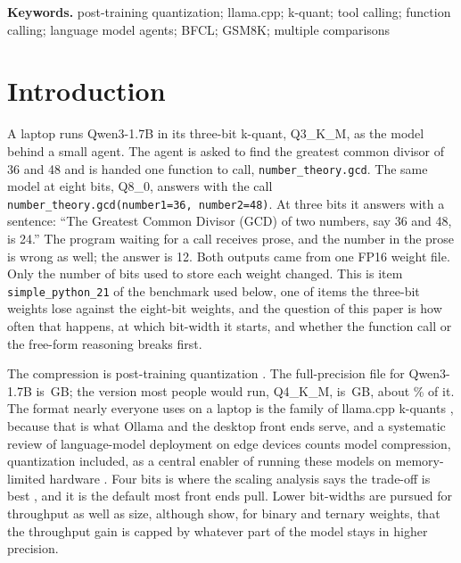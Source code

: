 \documentclass[12pt,letterpaper]{article}
\newcommand{\qm}{Qwen3-1.7B}
\begin{document}
\begin{abstract}
\textbf{Conclusions.} At four bits no model shows a single-call loss larger than its paired interval allows: under the coerced verdict no lower interval end is below $\qtFourBitLoCoerced{}$ points and the minimum detectable difference is \qtFourBitMdeMin{} to \qtFourBitMdeMax{} points. At three bits \qm{} and, under strict scoring, Llama-3.2-3B lose accuracy; the other three models do not detectably. The length-driven collapse of chain-of-thought reasoning under three-bit weights does not reach a single tool call. A strict schema score can move in either direction under quantization because it also measures a formatting habit, and part of a checker's decode-failure count can be its own parser, so a coerced score and the failure types belong beside it.
\end{abstract}

\textbf{Keywords.} post-training quantization; llama.cpp; k-quant; tool calling; function calling; language model agents; BFCL; GSM8K; multiple comparisons

\section{Introduction}

A laptop runs \qm{} in its three-bit k-quant, Q3\_K\_M, as the model behind a small agent. The agent is asked to find the greatest common divisor of 36 and 48 and is handed one function to call, \texttt{number\_theory.gcd}. The same model at eight bits, Q8\_0, answers with the call \texttt{number\_theory.gcd(number1=36, number2=48)}. At three bits it answers with a sentence: ``The Greatest Common Divisor (GCD) of two numbers, say 36 and 48, is 24.'' The program waiting for a call receives prose, and the number in the prose is wrong as well; the answer is 12. Both outputs came from one FP16 weight file. Only the number of bits used to store each weight changed. This is item \texttt{simple\_python\_21} of the benchmark used below, one of \qtLostThree{} items the three-bit weights lose against the eight-bit weights, and the question of this paper is how often that happens, at which bit-width it starts, and whether the function call or the free-form reasoning breaks first.

The compression is post-training quantization \citep{dettmers2022int8,gptq2023,awq2024}. The full-precision file for \qm{} is \qtSizeFp{}\,GB; the version most people would run, Q4\_K\_M, is \qtSizeFour{}\,GB, about \qtCompressFour{}\% of it. The format nearly everyone uses on a laptop is the family of llama.cpp k-quants \citep{llamacpp}, because that is what Ollama and the desktop front ends serve, and a systematic review of language-model deployment on edge devices counts model compression, quantization included, as a central enabler of running these models on memory-limited hardware \citep{dincer2026edge}. Four bits is where the scaling analysis says the trade-off is best \citep{dettmers2023case,kumar2024precision}, and it is the default most front ends pull. Lower bit-widths are pursued for throughput as well as size, although \citet{malekar2025amdahl} show, for binary and ternary weights, that the throughput gain is capped by whatever part of the model stays in higher precision.
\end{document}
